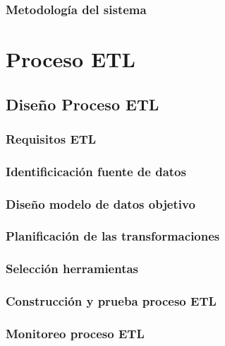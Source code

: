 \documentclass{report}
\begin{document}
\subsection{Metodología del sistema}


\chapter{Proceso ETL}

\section{Diseño Proceso ETL}


\subsection{Requisitos ETL}


\subsection{Identificicación fuente de datos}


\subsection{Diseño modelo de datos objetivo}


\subsection{Planificación de las transformaciones}


\subsection{Selección herramientas}


\subsection{Construcción y prueba proceso ETL}


\subsection{Monitoreo proceso ETL}




\end{document}
